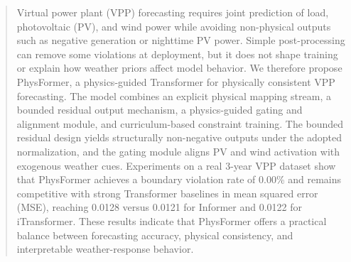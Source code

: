 \begin{abstract}
	Virtual power plant (VPP) forecasting requires joint prediction of load, photovoltaic (PV), and wind power while avoiding non-physical outputs such as negative generation or nighttime PV power. Simple post-processing can remove some violations at deployment, but it does not shape training or explain how weather priors affect model behavior. We therefore propose PhysFormer, a physics-guided Transformer for physically consistent VPP forecasting. The model combines an explicit physical mapping stream, a bounded residual output mechanism, a physics-guided gating and alignment module, and curriculum-based constraint training. The bounded residual design yields structurally non-negative outputs under the adopted normalization, and the gating module aligns PV and wind activation with exogenous weather cues. Experiments on a real 3-year VPP dataset show that PhysFormer achieves a boundary violation rate of 0.00\% and remains competitive with strong Transformer baselines in mean squared error (MSE), reaching 0.0128 versus 0.0121 for Informer and 0.0122 for iTransformer. These results indicate that PhysFormer offers a practical balance between forecasting accuracy, physical consistency, and interpretable weather-response behavior.
\end{abstract}
